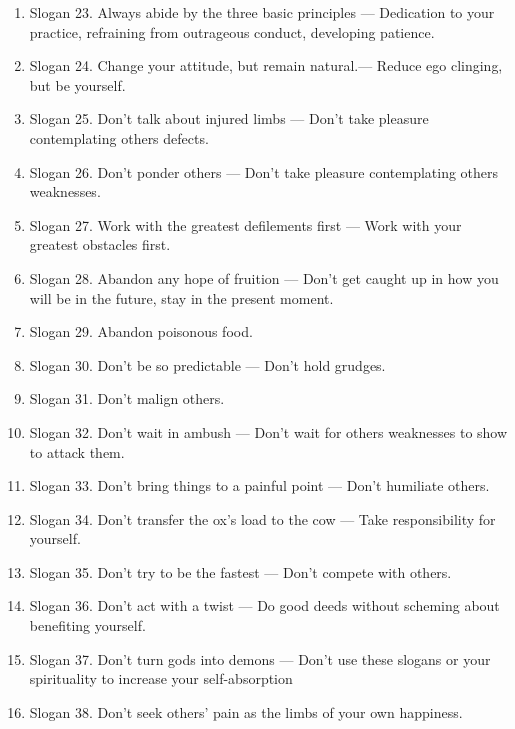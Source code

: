 \begin{enumerate}
\begin{enumerate}
        \item Slogan 23. Always abide by the three basic principles --- Dedication to your practice, refraining from outrageous conduct, developing patience.
        \item Slogan 24. Change your attitude, but remain natural.--- Reduce ego clinging, but be yourself.
        \item Slogan 25. Don't talk about injured limbs --- Don't take pleasure contemplating others defects.
        \item Slogan 26. Don't ponder others --- Don't take pleasure contemplating others weaknesses.
        \item Slogan 27. Work with the greatest defilements first --- Work with your greatest obstacles first.
        \item Slogan 28. Abandon any hope of fruition --- Don't get caught up in how you will be in the future, stay in the present moment.
        \item Slogan 29. Abandon poisonous food.
        \item Slogan 30. Don't be so predictable --- Don't hold grudges.
        \item Slogan 31. Don't malign others.
        \item Slogan 32. Don't wait in ambush --- Don't wait for others weaknesses to show to attack them.
        \item Slogan 33. Don't bring things to a painful point --- Don't humiliate others.
        \item Slogan 34. Don't transfer the ox's load to the cow --- Take responsibility for yourself.
        \item Slogan 35. Don't try to be the fastest --- Don't compete with others.
        \item Slogan 36. Don't act with a twist --- Do good deeds without scheming about benefiting yourself.
        \item Slogan 37. Don't turn gods into demons --- Don't use these slogans or your spirituality to increase your self-absorption
        \item Slogan 38. Don't seek others' pain as the limbs of your own happiness.


\end{enumerate}
\end{enumerate}
